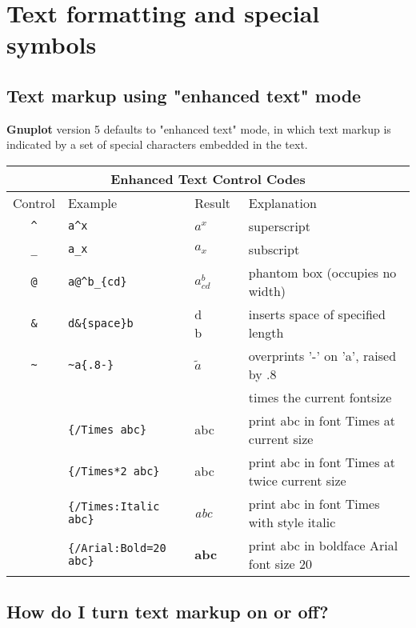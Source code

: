 \documentclass[a4paper,11pt]{article}
\newcommand{\Gnuplot}{\textbf{Gnuplot }}
\begin{document}
\section{Text formatting and special symbols}

\subsection{Text markup using "enhanced text" mode}

\Gnuplot version 5 defaults to "enhanced text" mode, in which text markup is
indicated by a set of special characters embedded in the text.

\begin{center}
\begin{tabular}{|clll|} \hline
\multicolumn{4}{|c|}{Enhanced Text Control Codes} \\ \hline
Control & Example & Result & Explanation \\ \hline
\verb~^~ & \verb~a^x~ & $a^x$ & superscript\\
\verb~_~ & \verb~a_x~ & $a_x$ & subscript\\
\verb~@~ & \verb~a@^b_{cd}~ & $a^b_{cd}$ &phantom box (occupies no width)\\
\verb~&~ & \verb~d&{space}b~ & d\verb*+     +b & inserts space of specified length\\
\verb|~| & \verb|~a{.8-}| & $\tilde{a}$ & overprints '-' on 'a', raised by .8\\
\verb~ ~ & \verb~ ~ & ~ ~ & times the current fontsize\\
\verb| | & \verb|{/Times abc}| & {\rm abc} & print abc in font Times at current size\\
\verb| | & \verb|{/Times*2 abc}| & \Large{\rm abc} & print abc in font Times at twice current size\\
\verb| | & \verb|{/Times:Italic abc}| & {\it abc} & print abc in font Times with style italic\\
\verb| | & \verb|{/Arial:Bold=20 abc}| & \Large\textsf{\textbf{abc}} & print abc in boldface Arial font size 20\\
\hline
\end{tabular}
\end{center}

\subsection{How do I turn text markup on or off?}
\end{document}
